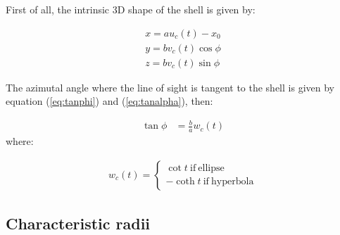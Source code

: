 First of all, the intrinsic 3D shape of the shell is given by:

\begin{align}
x = au_c(t)-x_0 \\ 
y = bv_c(t)\cos\phi \\
z =  bv_c(t)\sin\phi
\end{align}

The azimutal angle where the line of sight is tangent to the shell is given by equation (\ref{eq:tanphi}) and (\ref{eq:tanalpha}), then:

\begin{align}
\tan\phi &= \frac{b}{a}w_c(t) 
\end{align}
where:

\begin{align}
w_c(t) = \left\lbrace \begin{array}{c}
\cot t ~\mathrm{if~ellipse} \\
-\coth t ~\mathrm{if~hyperbola}
\end{array}\right.
\end{align}
\subsection{Characteristic radii}



